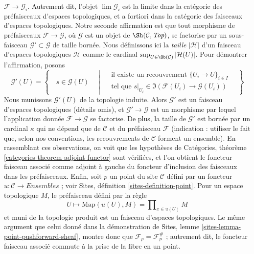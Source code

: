\begin{remark}
$\mathcal{F} \to \mathcal{G}_i$. Autrement dit, l'objet
$\lim \mathcal{G}_i$ est la limite dans la catégorie
des préfaisceaux d'espaces topologiques, et a fortiori dans la
catégorie des faisceaux d'espaces topologiques.
Notre seconde affirmation est que tout morphisme de préfaisceaux
$\mathcal{F} \to \mathcal{G}$, où $\mathcal{G}$ est un objet de
$\Sh(\mathcal{C}, \textit{Top})$, se factorise par un sous-faisceau
$\mathcal{G}' \subset \mathcal{G}$ de taille bornée.
Nous définissons ici la {\it taille} $|\mathcal{H}|$
d'un faisceau d'espaces topologiques $\mathcal{H}$ comme le cardinal
$\sup_{U \in \Ob(\mathcal{C})} |\mathcal{H}(U)|$.
Pour démontrer l'affirmation, posons
$$
\mathcal{G}'(U) =
\left\{
\quad
s \in \mathcal{G}(U)
\quad \middle| \quad
\begin{matrix}
\text{il existe un recouvrement }\{U_i \to U\}_{i \in I} \\
\text{tel que }
s|_{U_i} \in \Im(\mathcal{F}(U_i) \to \mathcal{G}(U_i))
\end{matrix}
\quad
\right\}
$$
Nous munissons $\mathcal{G}'(U)$ de la topologie induite.
Alors $\mathcal{G}'$ est un faisceau d'espaces topologiques (détails omis),
et $\mathcal{G}' \to \mathcal{G}$ est un morphisme par lequel
l'application donnée $\mathcal{F} \to \mathcal{G}$ se factorise. De plus,
la taille de $\mathcal{G}'$ est bornée par un cardinal
$\kappa$ qui ne dépend que de $\mathcal{C}$ et du préfaisceau $\mathcal{F}$
(indication : utiliser le fait que, selon nos conventions, les recouvrements de $\mathcal{C}$
forment un ensemble). En rassemblant ces observations, on voit
que les hypothèses de Catégories, théorème
\ref{categories-theorem-adjoint-functor}
sont vérifiées, et l'on obtient le foncteur faisceau associé comme adjoint à gauche
du foncteur d'inclusion des faisceaux dans les préfaisceaux.
Enfin, soit $p$ un point du
site $\mathcal{C}$ défini par un foncteur $u : \mathcal{C} \to \textit{Ensembles}$ ;
voir Sites, définition \ref{sites-definition-point}.
Pour un espace topologique $M$, le préfaisceau défini par la règle
$$
U \mapsto \text{Map}(u(U), M) = \prod\nolimits_{x \in u(U)} M
$$
et muni de la topologie produit est un faisceau d'espaces topologiques.
Le même argument que celui donné dans la démonstration de
Sites, lemme \ref{sites-lemma-point-pushforward-sheaf}, montre donc que
$\mathcal{F}_p = \mathcal{F}^\#_p$ ; autrement dit, le foncteur faisceau associé
commute à la prise de la fibre en un point.
\end{remark}




